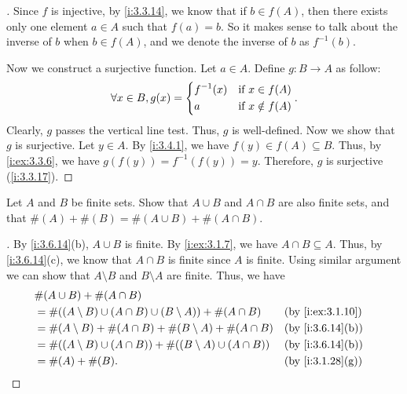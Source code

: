 \begin{proof}[]
  Since \(f\) is injective, by \cref{i:3.3.14}, we know that if \(b \in f(A)\), then there exists only one element \(a \in A\) such that \(f(a) = b\).
  So it makes sense to talk about the inverse of \(b\) when \(b \in f(A)\), and we denote the inverse of \(b\) as \(f^{-1}(b)\).

  Now we construct a surjective function.
  Let \(a \in A\).
  Define \(g : B \to A\) as follow:
  \[
    \forall x \in B, g(x) = \begin{dcases}
      f^{-1}(x) & \text{if } x \in f(A)    \\
      a         & \text{if } x \notin f(A)
    \end{dcases}.
  \]
  Clearly, \(g\) passes the vertical line test.
  Thus, \(g\) is well-defined.
  Now we show that \(g\) is surjective.
  Let \(y \in A\).
  By \cref{i:3.4.1}, we have \(f(y) \in f(A) \subseteq B\).
  Thus, by \cref{i:ex:3.3.6}, we have \(g(f(y)) = f^{-1}(f(y)) = y\).
  Therefore, \(g\) is surjective (\cref{i:3.3.17}).
\end{proof}

\begin{ex}\label{i:ex:3.6.9}
  Let \(A\) and \(B\) be finite sets.
  Show that \(A \cup B\) and \(A \cap B\) are also finite sets, and that \(\#(A) + \#(B) = \#(A \cup B) + \#(A \cap B)\).
\end{ex}

\begin{proof}[]
  By \cref{i:3.6.14}(b), \(A \cup B\) is finite.
  By \cref{i:ex:3.1.7}, we have \(A \cap B \subseteq A\).
  Thus, by \cref{i:3.6.14}(c), we know that \(A \cap B\) is finite since \(A\) is finite.
  Using similar argument we can show that \(A \setminus B\) and \(B \setminus A\) are finite.
  Thus, we have
  \begin{align*}
     & \#(A \cup B) + \#(A \cap B)                                                                       \\
     & = \#((A \setminus B) \cup (A \cap B) \cup (B \setminus A)) + \#(A \cap B)   &  & \by{i:ex:3.1.10} \\
     & = \#(A \setminus B) + \#(A \cap B) + \#(B \setminus A) + \#(A \cap B)       &  & \by{i:3.6.14}[b] \\
     & = \#((A \setminus B) \cup (A \cap B)) + \#((B \setminus A) \cup (A \cap B)) &  & \by{i:3.6.14}[b] \\
     & = \#(A) + \#(B).                                                            &  & \by{i:3.1.28}[g]
  \end{align*}
\end{proof}

